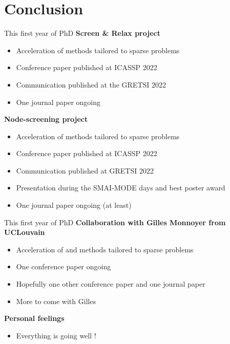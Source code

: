 \section{Conclusion}

\begin{frame}{This first year of PhD}
  \textbf{Screen \& Relax project}
  \begin{itemize}
    \item Acceleration of  methods tailored to  sparse problems
    \pause
    \item Conference paper published at ICASSP 2022
    \pause
    \item Communication published at the GRETSI 2022
    \pause
    \item One journal paper ongoing
  \end{itemize}
  \pause
  \textbf{Node-screening project}
  \begin{itemize}
    \item Acceleration of  methods tailored to  sparse problems
    \pause
    \item Conference paper published at ICASSP 2022
    \pause
    \item Communication published at GRETSI 2022
    \pause
    \item Presentation during the SMAI-MODE days and best poster award
    \pause
    \item One journal paper ongoing (at least)
  \end{itemize}
\end{frame}
\begin{frame}{This first year of PhD}
  \textbf{Collaboration with Gilles Monnoyer from UCLouvain}
  \begin{itemize}
    \item Acceleration of  and  methods tailored to  sparse problems
    \pause
    \item One conference paper ongoing
    \pause
    \item Hopefully one other conference paper and one journal paper
    \pause
    \item More to come with Gilles
  \end{itemize}
  \pause
  \textbf{Personal feelings}
  \begin{itemize}
    \item Everything is going well !
  \end{itemize}
\end{frame}